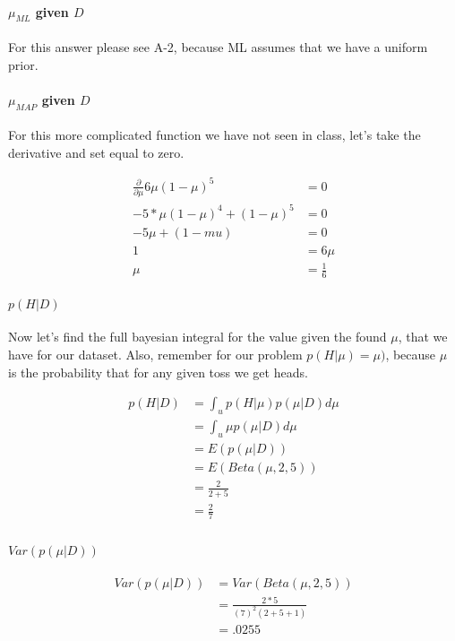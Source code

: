\documentclass[paper=a4, fontsize=11pt]{scrartcl} %
\begin{document}
\paragraph{$\mu_{ML}$ given $D$}
For this answer please see A-2, because ML assumes that we have a uniform prior.

\paragraph{$\mu_{MAP}$ given $D$}
For this more complicated function we have not seen in class, let's take the derivative and set equal to zero.

\begin{align}
\frac{\partial}{\partial \mu} 6 \mu(1-\mu)^5 &= 0 \\
 -5*\mu(1-\mu)^4 + (1-\mu)^5 &= 0 \\
-5\mu + (1-mu )&= 0 \\
 1 &= 6\mu \\
\mu &= \frac{1}{6}
\end{align}

\paragraph{$p(H|D)$}
Now let's find the full bayesian integral for the value given the found $\mu$, that we have for our dataset.  Also, remember for our problem $p(H|\mu) = \mu)$, because $\mu$ is the probability that for any given toss we get heads.

\begin{align}
p(H|D) &= \int_u p(H|\mu)p(\mu|D)d\mu \\
&= \int_u \mu p(\mu|D)d\mu \\
&= E( p(\mu|D)) \\
&= E( Beta(\mu,2,5)) \\
&= \frac{2}{2+5} \\
&= \frac{2}{7} \\
\end{align}

\paragraph{$Var(p(\mu|D))$}

\begin{align}
Var(p(\mu|D)) &=  Var(Beta(\mu,2,5)) \\
&= \frac{2*5}{(7)^2(2+5+1)} \\
&= .0255
\end{align}
\end{document}
